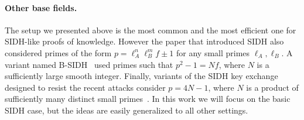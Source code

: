 \paragraph{Other base fields.}
The setup we presented above is the most common and the most efficient one for SIDH-like proofs of knowledge.
However the paper that introduced SIDH also considered primes of the form $p = \ell_A^n \ell_B^m f \pm 1$ for any small primes $\ell_A,\ell_B$.
A variant named B-SIDH~\cite{10.1007/978-3-030-64834-3_15} used primes such that $p^2 - 1 = Nf$, where $N$ is a sufficiently large smooth integer.
Finally, variants of the SIDH key exchange designed to resist the recent attacks consider $p = 4N - 1$, where $N$ is a product of sufficiently many distinct small primes~\cite{cryptoeprint:2022/1019,cryptoeprint:2022/1054}.
In this work we will focus on the basic SIDH case, but the ideas are easily generalized to all other settings.

